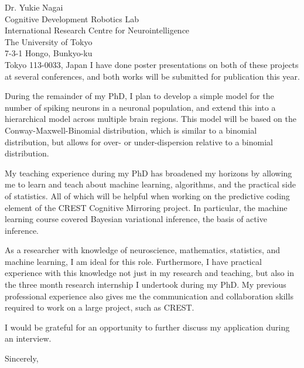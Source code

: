 \documentclass[11pt]{letter} %
\begin{document}
\begin{letter}{Dr. Yukie Nagai \\ 
  Cognitive Development Robotics Lab \\ 
  International Research Centre for Neurointelligence \\
  The University of Tokyo \\
  7-3-1 Hongo, Bunkyo-ku \\
  Tokyo 113-0033, Japan}
  I have done poster presentations on both of these projects at several conferences, and both works will be submitted for publication this year. 

  During the remainder of my PhD, I plan to develop a simple model for the number of spiking neurons in a neuronal population, and extend this into a hierarchical model across multiple brain regions. This model will be based on the Conway-Maxwell-Binomial distribution, which is similar to a binomial distribution, but allows for over- or under-dispersion relative to a binomial distribution. 

  My teaching experience during my PhD has broadened my horizons by allowing me to learn and teach about machine learning, algorithms, and the practical side of statistics. All of which will be helpful when working on the predictive coding element of the CREST Cognitive Mirroring project. In particular, the machine learning course covered Bayesian variational inference, the basis of active inference.

  As a researcher with knowledge of neuroscience, mathematics, statistics, and machine learning, I am ideal for this role. Furthermore, I have practical experience with this knowledge not just in my research and teaching, but also in the three month research internship I undertook during my PhD. My previous professional experience also gives me the communication and collaboration skills required to work on a large project, such as CREST. 

  I would be grateful for an opportunity to further discuss my application during an interview.

  \vspace{2\parskip} %
  \closing{Sincerely,}
  \vspace{2\parskip} %




\end{letter}
 
\end{document}
